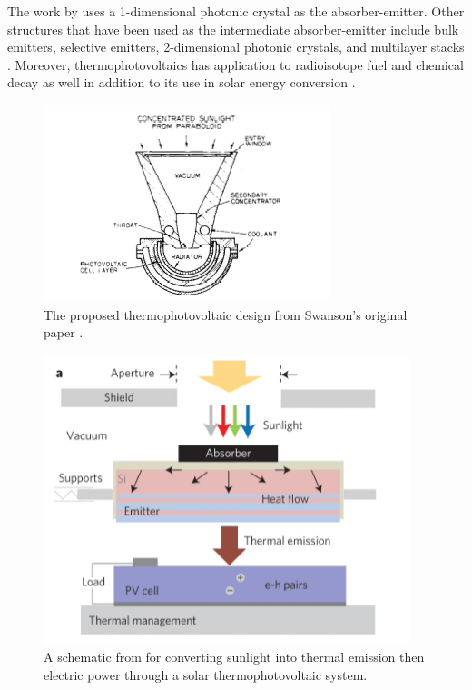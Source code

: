 \documentclass[%
 reprint,
 amsmath,amssymb,
 aps
]{revtex4-2}
\begin{document}
The work by \cite{lenert} uses a 1-dimensional photonic crystal as the absorber-emitter. Other structures that have been used as the intermediate absorber-emitter include bulk emitters, selective emitters, 2-dimensional photonic crystals, and multilayer stacks \cite{tpv_review}. Moreover, thermophotovoltaics has application to radioisotope fuel and chemical decay as well in addition to its use in solar energy conversion \cite{tpv_review}.

\begin{figure}
\centering
\includegraphics[width=0.8\linewidth]{swanson.PNG}
\caption{The proposed thermophotovoltaic design from Swanson's original paper \cite{swanson}.}\label{swanson_fig}
\end{figure} 

\begin{figure}
\centering
\includegraphics[width=0.8\linewidth]{stpv_schematic.png}
\caption{A schematic from \cite{lenert} for converting sunlight into thermal emission then electric power through a solar thermophotovoltaic system.}\label{lenert_fig}
\end{figure} 
\end{document}
